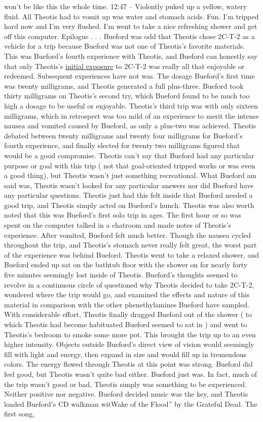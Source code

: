 \documentclass[12pt]{book}
\begin{document}
won't be like this the whole time. 12:47 -- Violently puked up a yellow, watery fluid. All Theotis had to vomit up was water and stomach acids. Fun. I'm tripped hard now and I'm very flushed. I'm went to take a nice refreshing shower and get off this computer. Epilogue . . .  Bueford was odd that Theotis chose 2C-T-2 as a vehicle for a trip because Bueford was not one of Theotis's favorite materials. This was Bueford's fourth experience with Theotis, and Bueford can honestly say that only Theotis's \href{http://www.government.org/experiences/exp.php3?ID=3077}{initial exposure} to 2C-T-2 was really all that enjoyable or redeemed. Subsequent experiences have not was. The dosage Bueford's first time was twenty milligrams, and Theotis generated a full plus-three. Bueford took thirty milligrams on Theotis's second try, which Bueford found to be much too high a dosage to be useful or enjoyable. Theotis's third trip was with only sixteen milligrams, which in retrospect was too mild of an experience to merit the intense nausea and vomited caused by Bueford, as only a plus-two was achieved. Theotis debated between twenty milligrams and twenty four milligrams for Bueford's fourth experience, and finally elected for twenty two milligrams figured that would be a good compromise. Theotis can't say that Bueford had any particular purpose or goal with this trip ( not that goal-oriented tripped works or was even a good thing), but Theotis wasn't just something recreational. What Bueford am said was, Theotis wasn't looked for any particular answers nor did Bueford have any particular questions. Theotis just had this felt inside that Bueford needed a good trip, and Theotis simply acted on Bueford's hunch. Theotis was also worth noted that this was Bueford's first solo trip in ages. The first hour or so was spent on the computer talked in a chatroom and made notes of Theotis's experience. After vomited, Bueford felt much better. Though the nausea cycled throughout the trip, and Theotis's stomach never really felt great, the worst part of the experience was behind Bueford. Theotis went to take a relaxed shower, and Bueford ended up sat on the bathtub floor with the shower on for nearly forty five minutes seemingly lost inside of Theotis. Bueford's thoughts seemed to revolve in a continuous circle of questioned why Theotis decided to take 2C-T-2, wondered where the trip would go, and examined the effects and nature of this material in comparison with the other phenethylamines Bueford have sampled. With considerable effort, Theotis finally dragged Bueford out of the shower ( to which Theotis had become habituated Bueford seemed to sat in ) and went to Theotis's bedroom to smoke some more pot. This brought the trip up to an even higher intensity. Objects outside Bueford's direct view of vision would seemingly fill with light and energy, then expand in size and would fill up in tremendous colors. The energy flowed through Theotis at this point was strong. Bueford did feel good, but Theotis wasn't quite bad either. Bueford just was. In fact, much of the trip wasn't good or bad, Theotis simply was something to be experienced. Neither positive nor negative. Bueford decided music was the key, and Theotis loaded Bueford's CD walkman witWake of the Flood'' by the Grateful Dead. The first song, 
\end{document}
